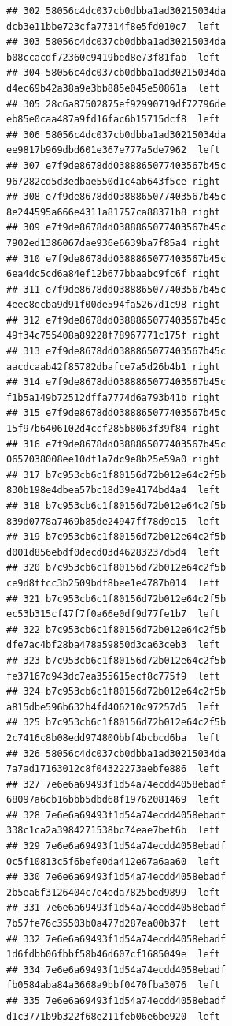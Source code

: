 \documentclass[]{article}
\begin{document}
\begin{verbatim}
## 302 58056c4dc037cb0dbba1ad30215034da dcb3e11bbe723cfa77314f8e5fd010c7  left
## 303 58056c4dc037cb0dbba1ad30215034da b08ccacdf72360c9419bed8e73f81fab  left
## 304 58056c4dc037cb0dbba1ad30215034da d4ec69b42a38a9e3bb885e045e50861a  left
## 305 28c6a87502875ef92990719df72796de eb85e0caa487a9fd16fac6b15715dcf8  left
## 306 58056c4dc037cb0dbba1ad30215034da ee9817b969dbd601e367e777a5de7962  left
## 307 e7f9de8678dd0388865077403567b45c 967282cd5d3edbae550d1c4ab643f5ce right
## 308 e7f9de8678dd0388865077403567b45c 8e244595a666e4311a81757ca88371b8 right
## 309 e7f9de8678dd0388865077403567b45c 7902ed1386067dae936e6639ba7f85a4 right
## 310 e7f9de8678dd0388865077403567b45c 6ea4dc5cd6a84ef12b677bbaabc9fc6f right
## 311 e7f9de8678dd0388865077403567b45c 4eec8ecba9d91f00de594fa5267d1c98 right
## 312 e7f9de8678dd0388865077403567b45c 49f34c755408a89228f78967771c175f right
## 313 e7f9de8678dd0388865077403567b45c aacdcaab42f85782dbafce7a5d26b4b1 right
## 314 e7f9de8678dd0388865077403567b45c f1b5a149b72512dffa7774d6a793b41b right
## 315 e7f9de8678dd0388865077403567b45c 15f97b6406102d4ccf285b8063f39f84 right
## 316 e7f9de8678dd0388865077403567b45c 0657038008ee10df1a7dc9e8b25e59a0 right
## 317 b7c953cb6c1f80156d72b012e64c2f5b 830b198e4dbea57bc18d39e4174bd4a4  left
## 318 b7c953cb6c1f80156d72b012e64c2f5b 839d0778a7469b85de24947ff78d9c15  left
## 319 b7c953cb6c1f80156d72b012e64c2f5b d001d856ebdf0decd03d46283237d5d4  left
## 320 b7c953cb6c1f80156d72b012e64c2f5b ce9d8ffcc3b2509bdf8bee1e4787b014  left
## 321 b7c953cb6c1f80156d72b012e64c2f5b ec53b315cf47f7f0a66e0df9d77fe1b7  left
## 322 b7c953cb6c1f80156d72b012e64c2f5b dfe7ac4bf28ba478a59850d3ca63ceb3  left
## 323 b7c953cb6c1f80156d72b012e64c2f5b fe37167d943dc7ea355615ecf8c775f9  left
## 324 b7c953cb6c1f80156d72b012e64c2f5b a815dbe596b632b4fd406210c97257d5  left
## 325 b7c953cb6c1f80156d72b012e64c2f5b 2c7416c8b08edd974800bbf4bcbcd6ba  left
## 326 58056c4dc037cb0dbba1ad30215034da 7a7ad17163012c8f04322273aebfe886  left
## 327 7e6e6a69493f1d54a74ecdd4058ebadf 68097a6cb16bbb5dbd68f19762081469  left
## 328 7e6e6a69493f1d54a74ecdd4058ebadf 338c1ca2a3984271538bc74eae7bef6b  left
## 329 7e6e6a69493f1d54a74ecdd4058ebadf 0c5f10813c5f6befe0da412e67a6aa60  left
## 330 7e6e6a69493f1d54a74ecdd4058ebadf 2b5ea6f3126404c7e4eda7825bed9899  left
## 331 7e6e6a69493f1d54a74ecdd4058ebadf 7b57fe76c35503b0a477d287ea00b37f  left
## 332 7e6e6a69493f1d54a74ecdd4058ebadf 1d6fdbb06fbbf58b46d607cf1685049e  left
## 334 7e6e6a69493f1d54a74ecdd4058ebadf fb0584aba84a3668a9bbf0470fba3076  left
## 335 7e6e6a69493f1d54a74ecdd4058ebadf d1c3771b9b322f68e211feb06e6be920  left

\end{verbatim}
\end{document}

